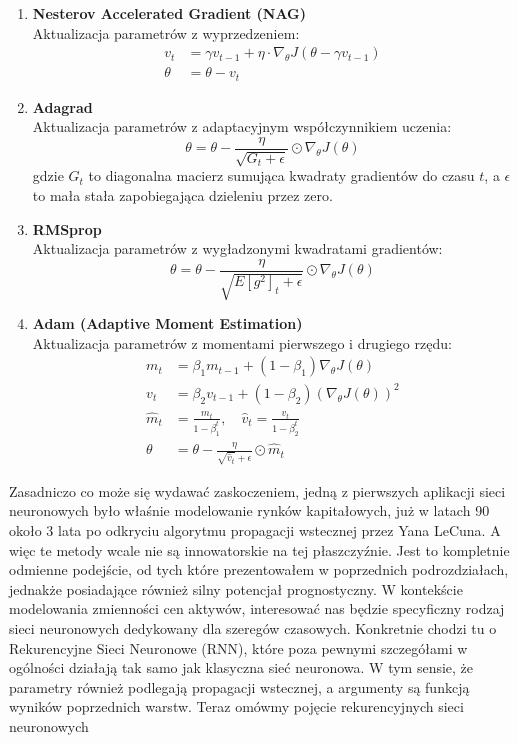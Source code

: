 \begin{enumerate}
\begin{enumerate}[label=\arabic*.]
    \item \textbf{Nesterov Accelerated Gradient (NAG)}\\
    Aktualizacja parametrów z wyprzedzeniem:
    \begin{align*}
    v_t &= \gamma v_{t-1} + \eta \cdot \nabla_\theta J(\theta - \gamma v_{t-1}) \\
    \theta &= \theta - v_t
    \end{align*}
    
    \item \textbf{Adagrad}\\
    Aktualizacja parametrów z adaptacyjnym współczynnikiem uczenia:
    \[ \theta = \theta - \frac{\eta}{\sqrt{G_t + \epsilon}} \odot \nabla_\theta J(\theta) \]
    gdzie \(G_t\) to diagonalna macierz sumująca kwadraty gradientów do czasu \(t\), a \(\epsilon\) to mała stała zapobiegająca dzieleniu przez zero.
    
    \item \textbf{RMSprop}\\
    Aktualizacja parametrów z wygładzonymi kwadratami gradientów:
    \[ \theta = \theta - \frac{\eta}{\sqrt{E[g^2]_t + \epsilon}} \odot \nabla_\theta J(\theta) \]
    
    \item \textbf{Adam (Adaptive Moment Estimation)}\\
    Aktualizacja parametrów z momentami pierwszego i drugiego rzędu:
    \begin{align*}
    m_t &= \beta_1 m_{t-1} + (1 - \beta_1) \nabla_\theta J(\theta) \\
    v_t &= \beta_2 v_{t-1} + (1 - \beta_2) (\nabla_\theta J(\theta))^2 \\
    \hat{m}_t &= \frac{m_t}{1 - \beta_1^t}, \quad \hat{v}_t = \frac{v_t}{1 - \beta_2^t} \\
    \theta &= \theta - \frac{\eta}{\sqrt{\hat{v}_t} + \epsilon} \odot \hat{m}_t
    \end{align*}
\end{enumerate}
\label{subsec:podrozdzial-2-rzedu}
Zasadniczo co może się wydawać zaskoczeniem, jedną z pierwszych aplikacji sieci neuronowych było właśnie modelowanie rynków kapitałowych, już w latach 90 około 3 lata po odkryciu algorytmu propagacji wstecznej przez Yana LeCuna. A więc te metody wcale nie są innowatorskie na tej płaszczyźnie. Jest to kompletnie odmienne podejście, od tych które prezentowałem w poprzednich podrozdziałach, jednakże posiadające również silny potencjał prognostyczny. W kontekście modelowania zmienności cen aktywów, interesować nas będzie specyficzny rodzaj sieci neuronowych dedykowany dla szeregów czasowych. Konkretnie chodzi tu o Rekurencyjne Sieci Neuronowe (RNN), które poza pewnymi szczegółami w ogólności działają tak samo jak klasyczna sieć neuronowa. W tym sensie, że parametry również podlegają propagacji wstecznej, a argumenty są funkcją wyników poprzednich warstw. 
Teraz omówmy pojęcie rekurencyjnych sieci neuronowych

\end{enumerate}
